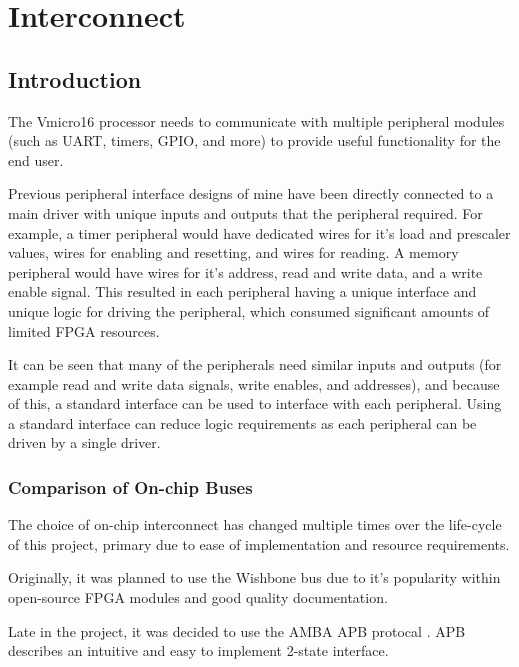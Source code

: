 
\newpage
\chapter{Interconnect}
{%
\startcontents[chapters]
}


\section{Introduction}
The Vmicro16 processor needs to communicate with multiple peripheral modules (such as UART, timers, GPIO, and more) to provide useful functionality for the end user.

Previous peripheral interface designs of mine have been directly connected to a main driver with unique inputs and outputs that the peripheral required. For example, a timer peripheral would have dedicated wires for it's load and prescaler values, wires for enabling and resetting, and wires for reading. A memory peripheral would have wires for it's address, read and write data, and a write enable signal. This resulted in each peripheral having a unique interface and unique logic for driving the peripheral, which consumed significant amounts of limited FPGA resources.

It can be seen that many of the peripherals need similar inputs and outputs (for example read and write data signals, write enables, and addresses), and because of this, a standard interface can be used to interface with each peripheral. Using a standard interface can reduce logic requirements as each peripheral can be driven by a single driver.

\subsection{Comparison of On-chip Buses}
The choice of on-chip interconnect has changed multiple times over the life-cycle of this project, primary due to ease of implementation and resource requirements. 

Originally, it was planned to use the Wishbone bus \cite{wishbone} due to it's popularity within open-source FPGA modules and good quality documentation.

Late in the project, it was decided to use the AMBA APB protocal \cite {ambaapb}. APB describes an intuitive and easy to implement 2-state interface.

